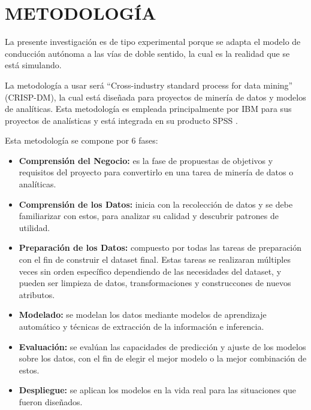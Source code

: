 \section{METODOLOGÍA}
La presente investigación es de tipo experimental porque se adapta el modelo de conducción autónoma a las vías de doble sentido, la cual es la realidad que se está simulando.

La metodología a usar será ``Cross-industry standard process for data mining'' (CRISP-DM), la cual está diseñada para proyectos de minería de datos y modelos de analíticas. Esta metodología es empleada principalmente por IBM para sus proyectos de analísticas y está integrada en su producto SPSS \citep{Chapman2000CRISPDM1S}.

Esta metodología se compone por 6 fases:

\begin{itemize}[nosep]
    \item \textbf{Comprensión del Negocio:} es la fase de propuestas de objetivos y requisitos del proyecto para convertirlo en una tarea de minería de datos o analíticas.
    \item \textbf{Comprensión de los Datos:} inicia con la recolección de datos y se debe familiarizar con estos, para analizar su calidad y descubrir patrones de utilidad.
    \item \textbf{Preparación de los Datos:} compuesto por todas las tareas de preparación con el fin de construir el dataset final. Estas tareas se realizaran múltiples veces sin orden específico dependiendo de las necesidades del dataset, y pueden ser limpieza de datos, transformaciones y construccones de nuevos atributos.
    \item \textbf{Modelado:} se modelan los datos mediante modelos de aprendizaje automático y técnicas de extracción de la información e inferencia.
    \item \textbf{Evaluación:} se evalúan las capacidades de predicción y ajuste de los modelos sobre los datos, con el fin de elegir el mejor modelo o la mejor combinación de estos.
    \item \textbf{Despliegue:} se aplican los modelos en la vida real para las situaciones que fueron diseñados.
\end{itemize}

